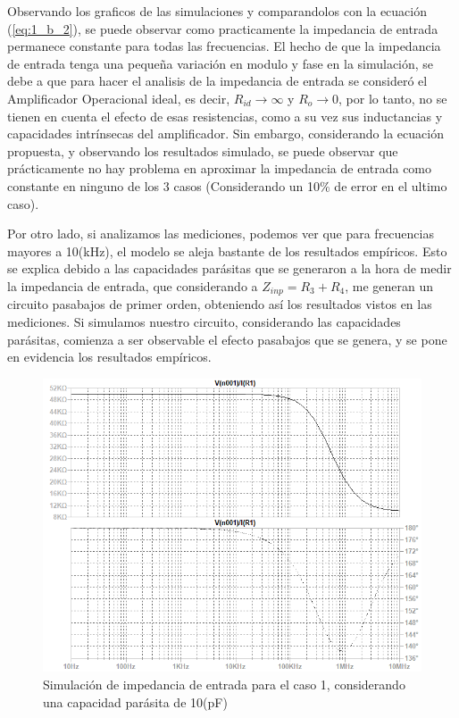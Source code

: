 Observando los graficos de las simulaciones y comparandolos con la
ecuación (\ref{eq:1_b_2}), se puede observar como practicamente la
impedancia de entrada permanece constante para todas las frecuencias.
El hecho de que la impedancia de entrada tenga una pequeña variación
en modulo y fase en la simulación, se debe a que para hacer el analisis
de la impedancia de entrada se consideró el Amplificador Operacional
ideal, es decir, $R_{id}\longrightarrow\infty$ y $R_{o}\longrightarrow0$,
por lo tanto, no se tienen en cuenta el efecto de esas resistencias,
como a su vez sus inductancias y capacidades intrínsecas del amplificador.
Sin embargo, considerando la ecuación propuesta, y observando los
resultados simulado, se puede observar que prácticamente no hay problema
en aproximar la impedancia de entrada como constante en ninguno de
los 3 casos (Considerando un 10\% de error en el ultimo caso).

Por otro lado, si analizamos las mediciones, podemos ver que para
frecuencias mayores a 10(kHz), el modelo se aleja bastante de los
resultados empíricos. Esto se explica debido a las capacidades parásitas
que se generaron a la hora de medir la impedancia de entrada, que
considerando a $Z_{inp}=R_{3}+R_{4}$, me generan un circuito pasabajos
de primer orden, obteniendo así los resultados vistos en las mediciones.
Si simulamos nuestro circuito, considerando las capacidades parásitas,
comienza a ser observable el efecto pasabajos que se genera, y se
pone en evidencia los resultados empíricos.

\begin{figure}[H]
\begin{centering}
\includegraphics[scale=0.5]{../Ex1/iB/Resources1b/zinp1_sim_para}
\par\end{centering}
\caption{Simulación de impedancia de entrada para el caso 1, considerando una
capacidad parásita de 10(pF)}

\end{figure}

